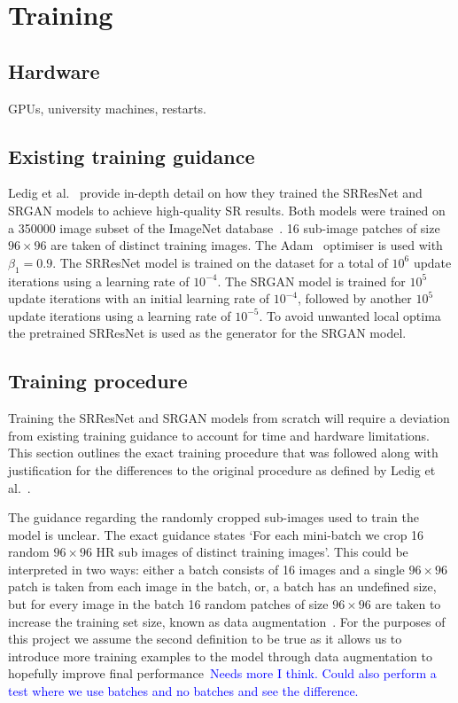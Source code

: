 \section{Training}

\subsection{Hardware}
GPUs, university machines, restarts.

\subsection{Existing training guidance}
Ledig et al.~\cite{srgan} provide in-depth detail on how they trained the SRResNet and SRGAN models to achieve high-quality SR results. Both models were trained on a 350000 image subset of the ImageNet database~\cite{ref}. 16 sub-image patches of size $96 \times 96$ are taken of distinct training images. The Adam~\cite{ref} optimiser is used with $\beta_1 = 0.9$. The SRResNet model is trained on the dataset for a total of $10^6$ update iterations using a learning rate of $10^{-4}$. The SRGAN model is trained for $10^5$ update iterations with an initial learning rate of $10^{-4}$, followed by another $10^5$ update iterations using a learning rate of $10^{-5}$. To avoid unwanted local optima the pretrained SRResNet is used as the generator for the SRGAN model.

\subsection{Training procedure}\label{subsec:procedure}
Training the SRResNet and SRGAN models from scratch will require a deviation from existing training guidance to account for time and hardware limitations. This section outlines the exact training procedure that was followed along with justification for the differences to the original procedure as defined by Ledig et al.~\cite{srgan}.

The guidance regarding the randomly cropped sub-images used to train the model is unclear. The exact guidance states `For each mini-batch we crop 16 random $96 \times 96$ HR sub images of distinct training images'. This could be interpreted in two ways: either a batch consists of 16 images and a single $96 \times 96$ patch is taken from each image in the batch, or, a batch has an undefined size, but for every image in the batch 16 random patches of size $96 \times 96$ are taken to increase the training set size, known as data augmentation~\cite{ref}. For the purposes of this project we assume the second definition to be true as it allows us to introduce more training examples to the model through data augmentation to hopefully improve final performance\ \textcolor{blue}{Needs more I think. Could also perform a test where we use batches and no batches and see the difference.}

